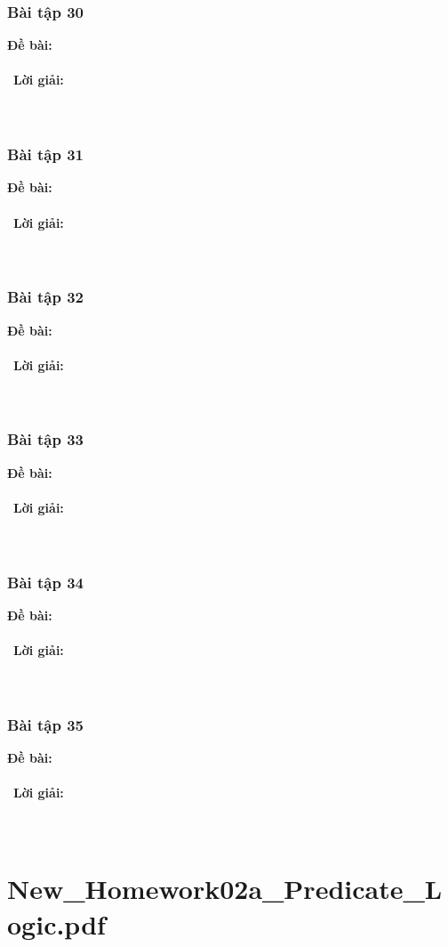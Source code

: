 \documentclass[a4paper]{article}
\begin{document}
\subsubsection{Bài tập 30}
\textbf{Đề bài:} 
\\\ \\\
\textbf{Lời giải:} \\\ \\\
\clearpage
\subsubsection{Bài tập 31}
\textbf{Đề bài:} 
\\\ \\\
\textbf{Lời giải:} \\\ \\\
\clearpage
\subsubsection{Bài tập 32}
\textbf{Đề bài:} 
\\\ \\\
\textbf{Lời giải:} \\\ \\\
\clearpage
\subsubsection{Bài tập 33}
\textbf{Đề bài:} 
\\\ \\\
\textbf{Lời giải:} \\\ \\\
\clearpage
\subsubsection{Bài tập 34}
\textbf{Đề bài:} 
\\\ \\\
\textbf{Lời giải:} \\\ \\\
\clearpage
\subsubsection{Bài tập 35}
\textbf{Đề bài:} 
\\\ \\\
\textbf{Lời giải:} \\\ \\\
\clearpage
\clearpage

\section{New\_Homework02a\_Predicate\_Logic.pdf}
\end{document}
